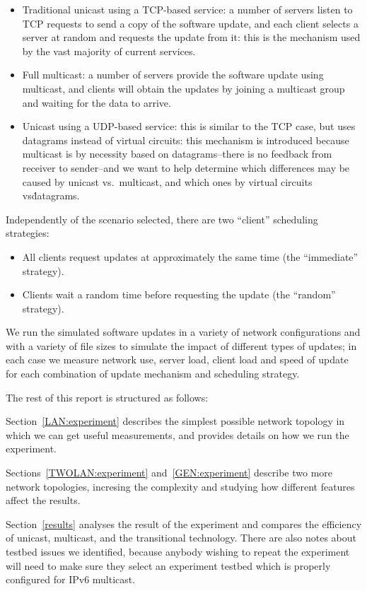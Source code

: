 \documentclass[a4paper,12pt]{article}
\begin{document}
\begin{itemize}
\item Traditional unicast using a TCP-based service: a number
of servers listen to TCP requests to send a copy of the software
update, and each client selects a server at random and requests
the update from it: this is the mechanism used by the vast
majority of current services.
\item Full multicast: a number of servers provide the software
update using multicast, and clients will obtain the updates by
joining a multicast group and waiting for the data to arrive.
\item Unicast using a UDP-based service: this is similar to the
TCP case, but uses datagrams instead of virtual circuits: this
mechanism is introduced because multicast is by necessity based
on datagrams--there is no feedback from receiver to sender--and
we want to help determine which differences may be caused by
unicast vs.\ multicast, and which ones by virtual circuits vs\.
datagrams.
\end{itemize}

Independently of the scenario selected, there are two ``client''
scheduling strategies:

\begin{itemize}
\item All clients request updates at approximately the same time
(the ``immediate'' strategy).
\item Clients wait a random time before requesting the update
(the ``random'' strategy).
\end{itemize}

We run the simulated software updates in a variety of network
configurations and with a variety of file sizes to simulate the
impact of different types of updates; in each case we measure network
use, server load, client load and speed of update for each combination
of update mechanism and scheduling strategy.

The rest of this report is structured as follows:

Section~\ref{LAN:experiment} describes the simplest possible network
topology in which we can get useful measurements, and provides details
on how we run the experiment.

Sections~\ref{TWOLAN:experiment} and~\ref{GEN:experiment} describe
two more network topologies, incresing the complexity and studying
how different features affect the results.

Section~\ref{results} analyses the result of the experiment and compares
the efficiency of unicast, multicast, and the transitional technology.
There are also notes about testbed issues we identified, because anybody
wishing to repeat the experiment will need to make sure they select
an experiment testbed which is properly configured for IPv6 multicast.
\end{document}
